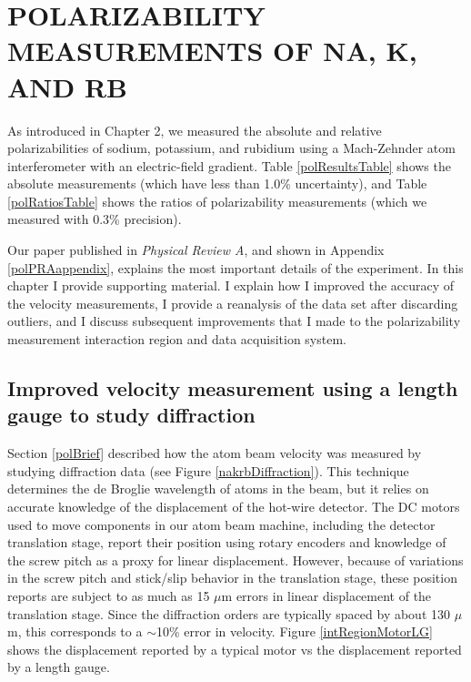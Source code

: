 \chapter{POLARIZABILITY MEASUREMENTS OF NA, K, AND RB}
\label{polChapter}

As introduced in Chapter 2, we measured the absolute and relative polarizabilities of sodium, potassium, and rubidium using a Mach-Zehnder atom interferometer with an electric-field gradient. Table \ref{polResultsTable} shows the absolute measurements (which have less than 1.0\% uncertainty), and Table \ref{polRatiosTable} shows the ratios of polarizability measurements (which we measured with 0.3\% precision). 


Our paper published in \emph{Physical Review A}, and shown in Appendix \ref{polPRAappendix}, explains the most important details of the experiment. In this chapter I provide supporting material. I explain how I improved the accuracy of the velocity measurements, I provide a reanalysis of the data set after discarding outliers, and I discuss subsequent improvements that I made to the polarizability measurement interaction region and data acquisition system.






\section{Improved velocity measurement using a length gauge to study diffraction}
\label{polLG}
Section \ref{polBrief} described how the atom beam velocity was measured by studying diffraction data (see Figure \ref{nakrbDiffraction}). This technique determines the de Broglie wavelength of atoms in the beam, but it relies on accurate knowledge of the displacement of the hot-wire detector. The DC motors used to move components in our atom beam machine, including the detector translation stage, report their position using rotary encoders and knowledge of the screw pitch as a proxy for linear displacement. However, because of variations in the screw pitch and stick/slip behavior in the translation stage, these position reports are subject to as much as 15 $\mu$m errors in linear displacement of the translation stage. Since the diffraction orders are typically spaced by about 130 $\mu$m, this corresponds to a $\sim$10\% error in velocity. Figure \ref{intRegionMotorLG} shows the displacement reported by a typical motor vs the displacement reported by a length gauge.


